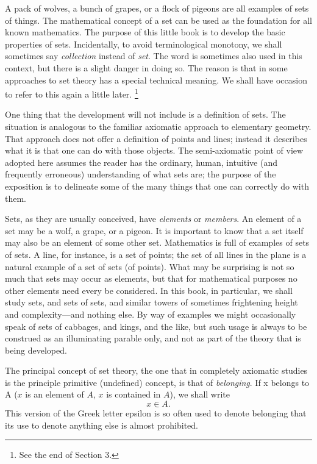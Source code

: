 A pack of wolves, a bunch of grapes, or a flock of pigeons
  are all examples of sets of things.
The mathematical concept of a set can be used as the
  foundation for all known mathematics.
The purpose of this little book is to develop the basic
  properties of sets.
Incidentally, to avoid terminological monotony, we shall sometimes
  say \textit{collection} instead of \textit{set}.
The word  is sometimes also used in this context,
  but there is a slight danger in doing so.
The reason is that in some approaches to set theory 
  has a special technical meaning.
We shall have occasion to refer to this again a little later.
  \footnote{
  See the end of Section 3.
  }

One thing that the development will not include is a definition
  of sets.
The situation is analogous to the familiar axiomatic approach to
  elementary geometry.
That approach does not offer a definition of points and lines;
  instead it describes what it is that one can do with those
  objects.
The semi-axiomatic point of view adopted here assumes the reader
  has the ordinary, human, intuitive (and frequently erroneous)
  understanding of what sets are; the purpose of the exposition is
  to delineate some of the many things that one can correctly do
  with them.

Sets, as they are usually conceived, have \textit{elements} or
  \textit{members}.
An element of a set may be a wolf, a grape, or a pigeon.
It is important to know that a set itself may also be an
  element of some other set.
Mathematics is full of examples of sets of sets.
A line, for instance, is a set of points; the set of all
  lines in the plane is a natural example of a set of sets (of
  points).
What may be surprising is not so much that sets may occur as
  elements, but that for mathematical purposes no other elements
  need every be considered.
In this book, in particular, we shall study sets, and sets of
  sets, and similar towers of sometimes frightening height and
  complexity---and nothing else.
By way of examples we might occasionally speak of sets of
  cabbages, and kings, and the like, but such usage is always to
  be construed as an illuminating parable only, and not as part
  of the theory that is being developed.

The principal concept of set theory, the one that in completely
  axiomatic studies is the principle primitive (undefined) concept,
  is that of \textit{belonging}.
If x belongs to A ($x$ is an element of $A$, $x$ is
  contained in $A$), we shall write
  \[
  x \in A.
  \]
This version of the Greek letter epsilon is so often used to
  denote belonging that its use to denote anything else is almost
  prohibited.